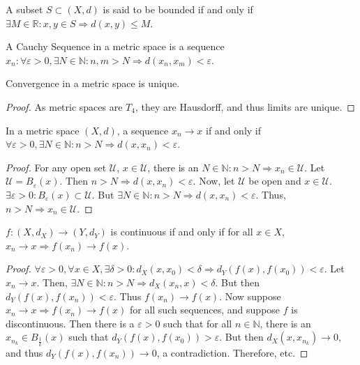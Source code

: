 \documentclass[crop=false,class=book,oneside]{standalone}
\begin{document}
            \begin{definition}
            A subset $S\subset (X,d)$ is said to be bounded if and only if $\exists M\in \mathbb{R}:x,y\in S\Rightarrow d(x,y)\leq M$.
            \end{definition}
            \begin{definition}
            A Cauchy Sequence in a metric space is a sequence $x_n:\forall \varepsilon>0,\exists N\in \mathbb{N}:n,m>N\Rightarrow d(x_n,x_m)<\varepsilon$.
            \end{definition}
            \begin{corollary}
            Convergence in a metric space is unique.
            \end{corollary}
            \begin{proof}
            As metric spaces are $T_4$, they are Hausdorff, and thus limits are unique.
            \end{proof}
            \begin{theorem}
            In a metric space $(X,d)$, a sequence $x_n\rightarrow x$ if and only if $\forall\varepsilon>0,\exists N\in \mathbb{N}:n>N\Rightarrow d(x,x_n)<\varepsilon$.
            \end{theorem}
            \begin{proof}
            For any open set $\mathcal{U}$, $x\in \mathcal{U}$, there is an $N\in \mathbb{N}:n>N\Rightarrow x_n \in \mathcal{U}$. Let $\mathcal{U}=B_{\varepsilon}(x)$. Then $n>N\Rightarrow d(x,x_n)<\varepsilon$. Now, let $\mathcal{U}$ be open and $x\in \mathcal{U}$. $\exists\varepsilon>0:B_{\varepsilon}(x)\subset \mathcal{U}$. But $\exists N\in \mathbb{N}:n>N\Rightarrow d(x,x_n)<\varepsilon$. Thus, $n>N\Rightarrow x_n\in \mathcal{U}$.
            \end{proof}
            \begin{theorem}
            $f:(X,d_X)\rightarrow (Y,d_Y)$ is continuous if and only if for all $x\in X$, $x_n\rightarrow x \Rightarrow f(x_n)\rightarrow f(x)$.
            \end{theorem}
            \begin{proof}
            $\forall \varepsilon>0,\forall x\in X,\exists \delta>0:d_X(x,x_0)<\delta \Rightarrow d_Y(f(x),f(x_0))<\varepsilon$. Let $x_n \rightarrow x$. Then, $\exists N\in \mathbb{N}:n>N \Rightarrow d_X(x_n,x)<\delta$. But then $d_Y(f(x),f(x_n)) < \varepsilon$. Thus $f(x_n)\rightarrow f(x)$. Now suppose $x_n\rightarrow x \Rightarrow f(x_n)\rightarrow f(x)$ for all such sequences, and suppose $f$ is discontinuous. Then there is a $\varepsilon>0$ such that for all $n\in \mathbb{N}$, there is an $x_{n_k} \in B_{\frac{1}{k}}(x)$ such that $d_Y(f(x),f(x_0))>\varepsilon$. But then $d_X(x,x_{n_k})\rightarrow 0$, and thus $d_Y(f(x),f(x_n))\rightarrow 0$, a contradiction. Therefore, etc.
            \end{proof}
\end{document}
